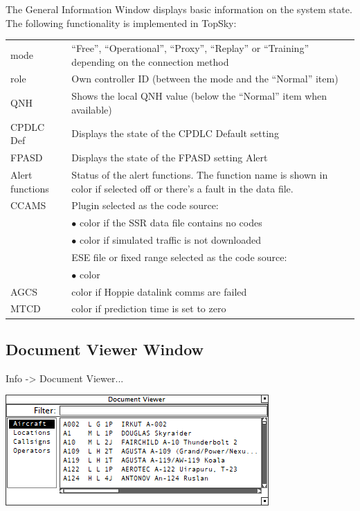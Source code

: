 \documentclass[11pt,a4paper]{memoir}
\newcommand{\colorref}[1]{\textit{\hyperref[#1]{\StrDel{#1}{color:}}}}
\begin{document}
The General Information Window displays basic information on the system state. The following functionality is implemented in TopSky:

\begin{tabular}{l l}
    mode                & “Free”, “Operational”, “Proxy”, “Replay” or “Training” depending on the connection method \\
    role                & Own controller ID (between the mode and the “Normal” item)\\
    QNH                 & Shows the local QNH value (below the “Normal” item when available)\\
    CPDLC Def           & Displays the state of the CPDLC Default setting\\
    FPASD               & Displays the state of the FPASD setting Alert\\
    Alert functions     & Status of the alert functions. The function name is shown in \colorref{color:Warning} color if selected off or there’s a fault in the data file.\\
    CCAMS               & Plugin selected as the code source:\\
                        & $\bullet$ \colorref{color:Urgency} color if the SSR data file contains no codes\\
                        & $\bullet$ \colorref{color:Warning} color if simulated traffic is not downloaded\\
                        & ESE file or fixed range selected as the code source:\\
                        & $\bullet$ \colorref{color:Warning} color\\
    AGCS                & \colorref{color:Warning} color if Hoppie datalink comms are failed\\
    MTCD                & \colorref{color:Warning} color if prediction time is set to zero    \\
\end{tabular}

\subsection{Document Viewer Window}
\label{win:dvw}

\textit{} Info -> Document Viewer...

\includegraphics{img/doc.png}
\end{document}
